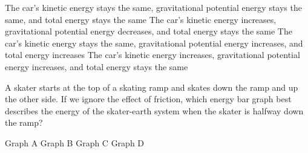 \documentclass[]{exam}
\begin{document}
\begin{questions}
\begin{randomizechoices}
    \choice The car's kinetic energy stays the same, gravitational potential energy stays the same, and total energy stays the same
    \correctchoice The car's kinetic energy increases, gravitational potential energy decreases, and total energy stays the same
    \choice The car's kinetic energy stays the same, gravitational potential energy increases, and total energy increases
    \choice The car's kinetic energy increases, gravitational potential energy increases, and total energy stays the same
\end{randomizechoices}

\question
A skater starts at the top of a skating ramp and skates down the ramp and up the other side. If we ignore the effect of friction, which energy bar graph best describes the energy of the skater-earth system when the skater is halfway down the ramp?

\begin{minipage}{0.6\textwidth}
    \centering
\end{minipage}%
\begin{minipage}{0.35\textwidth}
    \centering
    \begin{randomizechoices}
        \choice Graph A
        \choice Graph B
        \correctchoice Graph C
        \choice Graph D
    \end{randomizechoices}    
\end{minipage}%

\bigskip


\end{questions}
\end{document}
